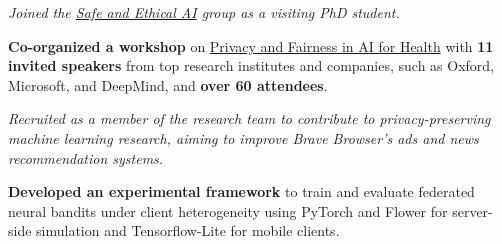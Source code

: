 \documentclass[11pt]{article}
\begin{document}
\begin{outerlist}
{\textit{Joined the \href{https://www.turing.ac.uk/research/research-programmes/artificial-intelligence-ai/safe-and-ethical}{Safe and Ethical AI} group as a visiting PhD student.}
  \begin{innerlist}
    \item \textbf{Co-organized a workshop} on \href{https://private-fair-ai.github.io/}{Privacy and Fairness in AI for Health} with \textbf{11 invited speakers} from top research institutes and companies, such as {Oxford}, {Microsoft}, and {DeepMind}, and \textbf{over 60 attendees}.
  \end{innerlist}}

{
\textit{Recruited as a member of the research team to contribute to privacy-preserving machine learning research, aiming to improve Brave Browser's ads and news recommendation systems.}
  \begin{innerlist}
    \item \textbf{Developed an experimental framework} to train and evaluate federated neural bandits under client heterogeneity using {PyTorch} and {Flower} for server-side simulation and {Tensorflow-Lite} for mobile clients.
  \end{innerlist}}



\end{outerlist}
\end{document}
